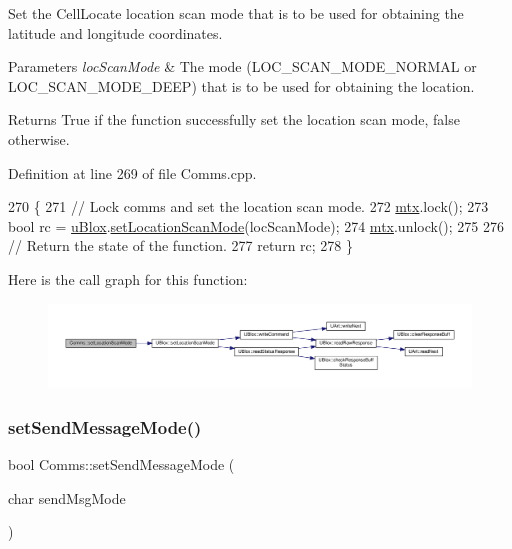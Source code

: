 Set the Cell\+Locate location scan mode that is to be used for obtaining the latitude and longitude coordinates.


\begin{DoxyParams}{Parameters}
{\em loc\+Scan\+Mode} & The mode (L\+O\+C\+\_\+\+S\+C\+A\+N\+\_\+\+M\+O\+D\+E\+\_\+\+N\+O\+R\+M\+AL or L\+O\+C\+\_\+\+S\+C\+A\+N\+\_\+\+M\+O\+D\+E\+\_\+\+D\+E\+EP) that is to be used for obtaining the location. \\
\hline
\end{DoxyParams}
\begin{DoxyReturn}{Returns}
True if the function successfully set the location scan mode, false otherwise. 
\end{DoxyReturn}


Definition at line 269 of file Comms.\+cpp.


\begin{DoxyCode}
270 \{
271     \textcolor{comment}{// Lock comms and set the location scan mode.}
272     \hyperlink{class_comms_a21df861b1202573e4cd0cb5666d638fe}{mtx}.lock();
273     \textcolor{keywordtype}{bool} rc = \hyperlink{class_comms_ac64dea134b116147e5441172346dbd6c}{uBlox}.\hyperlink{class_u_blox_aabed44fd41e16c9d1a8daba80f3bef06}{setLocationScanMode}(locScanMode);
274     \hyperlink{class_comms_a21df861b1202573e4cd0cb5666d638fe}{mtx}.unlock();
275 
276     \textcolor{comment}{// Return the state of the function.}
277     \textcolor{keywordflow}{return} rc;
278 \}
\end{DoxyCode}
Here is the call graph for this function\+:
\nopagebreak
\begin{figure}[H]
\begin{center}
\leavevmode
\includegraphics[width=350pt]{d8/dcc/class_comms_a73c0cd58db7daf118bd0b1726fc9dded_cgraph}
\end{center}
\end{figure}
\mbox{\label{class_comms_a1b6f5cafba74fc0e175f057e15656362}} 
\subsubsection{\texorpdfstring{set\+Send\+Message\+Mode()}{setSendMessageMode()}}
{\footnotesize\ttfamily bool Comms\+::set\+Send\+Message\+Mode (\begin{DoxyParamCaption}\item[{char}]{send\+Msg\+Mode }\end{DoxyParamCaption})}

